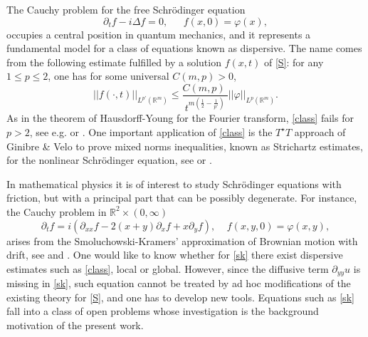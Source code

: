\documentclass[11pt,a4paper]{amsart}
\def \R {\mathbb{R}}
\def \vf{\varphi}
\newcommand{\Rm}{\mathbb R^m}
\newcommand{\p}{\partial}
\numberwithin{equation}{section}
\numberwithin{equation}{section}
\begin{document}
The Cauchy problem for the free Schr\"odinger equation
\begin{equation}\label{S}
\p_t f - i \Delta f = 0, \ \ \ \ \ \ \ f(x,0) = \vf(x),
\end{equation}
occupies a central position in quantum mechanics, and it represents a fundamental model for a class of equations known as dispersive. The name comes from the following estimate fulfilled by a solution $f(x,t)$ of \eqref{S}: for any $1\le p\le 2$, one has for some universal $C(m,p)>0$,  
\begin{equation}\label{class}
||f(\cdot,t)||_{L^{p'}(\Rm)} \le \frac{C(m,p)\ }{t^{m(\frac 12 - \frac 1{p'})}} ||\vf||_{L^p(\Rm)}.
\end{equation}
As in the theorem of Hausdorff-Young for the Fourier transform, \eqref{class} fails for $p>2$, see e.g. \cite[Lemma 1.2]{GV} or \cite[Proposition 2.2.3]{Caze}. One important application of \eqref{class} is the $T^\star T$ approach of Ginibre \& Velo to prove mixed norms inequalities, known as Strichartz estimates, for the nonlinear Schr\"odinger equation, see \cite{GVstrich} or \cite[Section 2.3]{Caze}. 



In mathematical physics it is of interest to study Schr\"odinger equations with friction, but with a principal part that can be possibly degenerate. For instance, the Cauchy problem in $\R^2\times(0,\infty)$
\begin{equation}\label{sk}
 \p_t f = i\left(\p_{xx} f  - 2(x+y) \p_x f + x \p_y f\right),\ \ \ \ \ f(x,y,0) = \vf(x,y),
\end{equation}
arises from the Smoluchowski-Kramers' approximation of Brownian motion with drift, see \cite{Bri} and \cite{Fre}. One would like to know whether for \eqref{sk} there exist dispersive estimates such as \eqref{class}, local or global. However, since the diffusive term $\p_{yy}u$ is missing in \eqref{sk}, such equation cannot be treated by ad hoc modifications of the existing theory for \eqref{S}, and one has to develop new tools.
Equations such as \eqref{sk} fall into a class of open problems whose investigation is the background motivation of the present work. 
\end{document}
